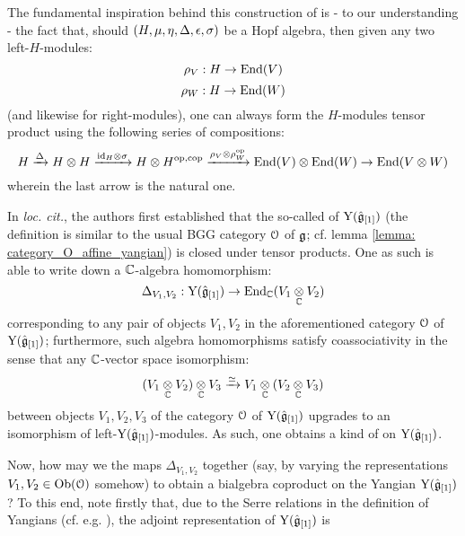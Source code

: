         The fundamental inspiration behind this construction of \cite{guay_nakajima_wendlandt_affine_yangian_coproduct} is - to our understanding - the fact that, should $(H, \mu, \eta, \Delta, \epsilon, \sigma)$ be a Hopf algebra, then given any two left-$H$-modules:
            $$\rho_V: H \to \mathrm{End}(V)$$
            $$\rho_W: H \to \mathrm{End}(W)$$
        (and likewise for right-modules), one can always form the $H$-modules tensor product using the following series of compositions:
            $$H \xrightarrow[]{\Delta} H \tensor H \xrightarrow[]{\id_H \tensor \sigma} H \tensor H^{\op, \cop} \xrightarrow[]{\rho_V \tensor \rho_W^{\op}} \End(V) \tensor \End(W) \to \End(V \tensor W)$$
        wherein the last arrow is the natural one.
        
        In \textit{loc. cit.}, the authors first established that the so-called  of $\mathrm{Y}(\hat{\mathfrak{g}}_{[1]})$ (the definition is similar to the usual BGG category $\mathcal{O}$ of $\mathfrak{g}$; cf. lemma \ref{lemma: category_O_affine_yangian}) is closed under tensor products. One as such is able to write down a $\mathbb{C}$-algebra homomorphism:
            $$\Delta_{V_1, V_2}: \rmY(\hat{\g}_{[1]}) \to \End_{\bbC}(V_1 \tensor_{\bbC} V_2)$$
        corresponding to any pair of objects $V_1, V_2$ in the aforementioned category $\mathcal{O}$ of $\mathrm{Y}(\hat{\mathfrak{g}}_{[1]})$; furthermore, such algebra homomorphisms satisfy coassociativity in the sense that any $\mathbb{C}$-vector space isomorphism:
            $$(V_1 \tensor_{\bbC} V_2) \tensor_{\bbC} V_3 \xrightarrow[]{\cong} V_1 \tensor_{\bbC} (V_2 \tensor_{\bbC} V_3)$$
        between objects $V_1, V_2, V_3$ of the category $\mathcal{O}$ of $\mathrm{Y}(\hat{\mathfrak{g}}_{[1]})$ upgrades to an isomorphism of left-$\mathrm{Y}(\hat{\mathfrak{g}}_{[1]})$-modules. As such, one obtains a kind of  on $\mathrm{Y}(\hat{\mathfrak{g}}_{[1]})$. 

        Now, how may we  the maps $\Delta_{V_1, V_2}$ together (say, by varying the representations $V_1, V_2 \in \mathrm{Ob}(\mathcal{O})$ somehow) to obtain a bialgebra coproduct on the Yangian $\mathrm{Y}(\hat{\mathfrak{g}}_{[1]})$ ? To this end, note firstly that, due to the Serre relations in the definition of Yangians (cf. e.g. \cite[Equation 2.7]{guay_nakajima_wendlandt_affine_yangian_coproduct}), the adjoint representation of $\mathrm{Y}(\hat{\mathfrak{g}}_{[1]})$ is  
        
